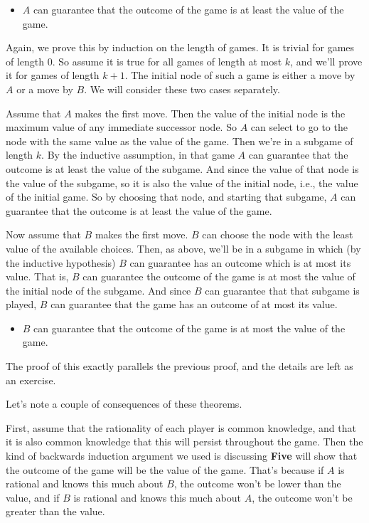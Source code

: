 \documentclass[openany]{book}
\begin{document}
\begin{itemize}
\item $A$ can guarantee that the outcome of the game is at least the value of the game.
\end{itemize}
Again, we prove this by induction on the length of games. It is trivial for games of length 0. So assume it is true for all games of length at most $k$, and we'll prove it for games of length $k+1$. The initial node of such a game is either a move by $A$ or a move by $B$. We will consider these two cases separately.

Assume that $A$ makes the first move. Then the value of the initial node is the maximum value of any immediate successor node. So $A$ can select to go to the node with the same value as the value of the game. Then we're in a subgame of length $k$. By the inductive assumption, in that game $A$ can guarantee that the outcome is at least the value of the subgame. And since the value of that node is the value of the subgame, so it is also the value of the initial node, i.e., the value of the initial game. So by choosing that node, and starting that subgame, $A$ can guarantee that the outcome is at least the value of the game.

Now assume that $B$ makes the first move. $B$ can choose the node with the least value of the available choices. Then, as above, we'll be in a subgame in which (by the inductive hypothesis) $B$ can guarantee has an outcome which is at most its value. That is, $B$ can guarantee the outcome of the game is at most the value of the initial node of the subgame. And since $B$ can guarantee that that subgame is played, $B$ can guarantee that the game has an outcome of at most its value.

\begin{itemize}
\item $B$ can guarantee that the outcome of the game is at most the value of the game.
\end{itemize}
The proof of this exactly parallels the previous proof, and the details are left as an exercise.

\bigskip \noindent Let's note a couple of consequences of these theorems.

First, assume that the rationality of each player is common knowledge, and that it is also common knowledge that this will persist throughout the game. Then the kind of backwards induction argument we used is discussing \textbf{Five} will show that the outcome of the game will be the value of the game. That's because if $A$ is rational and knows this much about $B$, the outcome won't be lower than the value, and if $B$ is rational and knows this much about $A$, the outcome won't be greater than the value.
\end{document}
